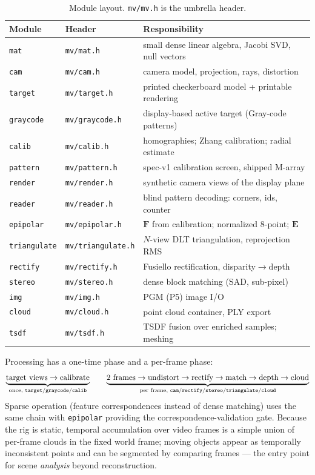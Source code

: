 \documentclass[11pt]{article}
\theoremstyle{definition}
\newcommand{\mat}[1]{\mathbf{#1}}
\newcommand{\F}{\mat{F}}
\newcommand{\E}{\mat{E}}
\newcommand{\code}[1]{\texttt{#1}}
\begin{document}
\begin{table}[ht]
\centering
\begin{tabular}{lll}
\toprule
Module & Header & Responsibility \\
\midrule
\code{mat}         & \code{mv/mat.h}         & small dense linear algebra, Jacobi SVD, null vectors \\
\code{cam}         & \code{mv/cam.h}         & camera model, projection, rays, distortion \\
\code{target}      & \code{mv/target.h}      & printed checkerboard model + printable rendering \\
\code{graycode}    & \code{mv/graycode.h}    & display-based active target (Gray-code patterns) \\
\code{calib}       & \code{mv/calib.h}       & homographies; Zhang calibration; radial estimate \\
\code{pattern}     & \code{mv/pattern.h}     & spec-v1 calibration screen, shipped M-array \\
\code{render}      & \code{mv/render.h}      & synthetic camera views of the display plane \\
\code{reader}      & \code{mv/reader.h}      & blind pattern decoding: corners, ids, counter \\
\code{epipolar}    & \code{mv/epipolar.h}    & $\F$ from calibration; normalized 8-point; $\E$ \\
\code{triangulate} & \code{mv/triangulate.h} & $N$-view DLT triangulation, reprojection RMS \\
\code{rectify}     & \code{mv/rectify.h}     & Fusiello rectification, disparity$\to$depth \\
\code{stereo}      & \code{mv/stereo.h}      & dense block matching (SAD, sub-pixel) \\
\code{img}         & \code{mv/img.h}         & PGM (P5) image I/O \\
\code{cloud}       & \code{mv/cloud.h}       & point cloud container, PLY export \\
\code{tsdf}        & \code{mv/tsdf.h}        & TSDF fusion over enriched samples; meshing \\
\bottomrule
\end{tabular}
\caption{Module layout. \code{mv/mv.h} is the umbrella header.}
\label{tab:modules}
\end{table}

Processing has a one-time phase and a per-frame phase:
\[
\underbrace{\text{target views}\rightarrow\text{calibrate}}_{\text{once, \code{target}/\code{graycode}/\code{calib}}}
\qquad
\underbrace{\text{2 frames}\rightarrow\text{undistort}\rightarrow\text{rectify}\rightarrow\text{match}\rightarrow\text{depth}\rightarrow\text{cloud}}_{\text{per frame, \code{cam}/\code{rectify}/\code{stereo}/\code{triangulate}/\code{cloud}}}
\]
Sparse operation (feature correspondences instead of dense matching) uses the
same chain with \code{epipolar} providing the correspondence-validation gate.
Because the rig is static, temporal accumulation over video frames is a
simple union of per-frame clouds in the fixed world frame; moving objects
appear as temporally inconsistent points and can be segmented by comparing
frames --- the entry point for scene \emph{analysis} beyond reconstruction.
\end{document}
